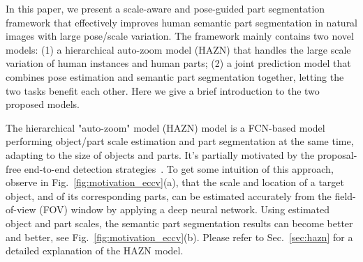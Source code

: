In this paper, we present a scale-aware and pose-guided part segmentation framework that effectively improves human semantic part segmentation in natural images with large pose/scale variation. The framework mainly contains two novel models: (1) a hierarchical auto-zoom model (HAZN) that handles the large scale variation of human instances and human parts; (2) a joint prediction model that combines pose estimation and semantic part segmentation together, letting the two tasks benefit each other. Here we give a brief introduction to the two proposed models.

The hierarchical "auto-zoom" model (HAZN) model is a FCN-based model performing object/part scale estimation and part segmentation at the same time, adapting to the size of objects and parts. It's partially motivated by the proposal-free end-to-end detection strategies~\cite{huang2015densebox,liang2015proposal,ren2015faster,redmon2016you}. To get some intuition of this approach, observe in Fig.~\ref{fig:motivation_eccv}(a), that the scale and location of a target object, and of its corresponding
parts, can be estimated accurately from the field-of-view (FOV) window
by applying a deep neural network. Using estimated object and part scales, the semantic part segmentation results can become better and better, see Fig.~\ref{fig:motivation_eccv}(b). Please refer to Sec.~\ref{sec:hazn} for a detailed explanation of the HAZN model. 

